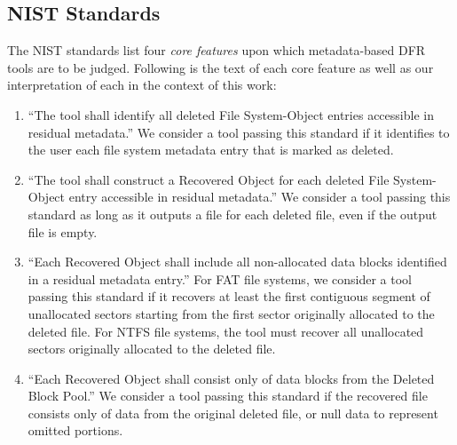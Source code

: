 \subsection{NIST Standards}
The NIST standards\cite{meta:dfr:standards} list four \emph{core features} upon which metadata-based DFR tools are to be judged.
Following is the text of each core feature as well as our interpretation of each in the context of this work:
\begin{enumerate}
 \item ``The tool shall identify all deleted File System-Object entries accessible in residual metadata.''\cite{meta:dfr:standards}
 We consider a tool passing this standard if it identifies to the user each file system metadata entry that is marked as deleted.
 \item ``The tool shall construct a Recovered Object for each deleted File System-Object entry accessible in residual metadata.''\cite{meta:dfr:standards}
 We consider a tool passing this standard as long as it outputs a file for each deleted file, even if the output file is empty.
 \item ``Each Recovered Object shall include all non-allocated data blocks identified in a residual metadata entry.''\cite{meta:dfr:standards}
 For FAT file systems, we consider a tool passing this standard if it recovers at least the first contiguous segment of unallocated sectors starting from the first sector originally allocated to the deleted file. For NTFS file systems, the tool must recover all unallocated sectors originally allocated to the deleted file.
 \item ``Each Recovered Object shall consist only of data blocks from the Deleted Block Pool.''\cite{meta:dfr:standards}
 We consider a tool passing this standard if the recovered file consists only of data from the original deleted file, or null data to represent omitted portions.
\end{enumerate}


